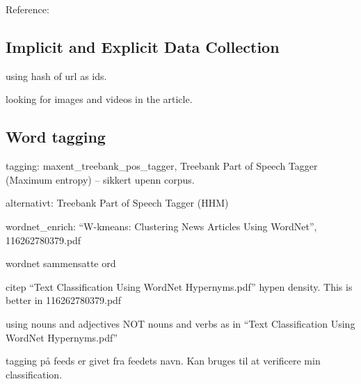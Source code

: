 

Reference: \cite{BleiTopics}



\subsection{Implicit and Explicit Data Collection}
\cite{MagdaliniWebMining}



using hash of url as ids.

looking for images and videos in the article.

\subsection{Word tagging}
tagging: maxent\_treebank\_pos\_tagger, Treebank Part of Speech Tagger (Maximum entropy) -- sikkert upenn corpus.

alternativt: Treebank Part of Speech Tagger (HHM)


wordnet\_enrich: ``W-kmeans: Clustering News Articles Using WordNet'', 116262780379.pdf

wordnet sammensatte ord

citep ``Text Classification Using WordNet Hypernyms.pdf''
hypen density. This is better in 116262780379.pdf

using nouns and adjectives NOT nouns and verbs as in ``Text Classification Using WordNet Hypernyms.pdf''


tagging på feeds er givet fra feedets navn. Kan bruges til at verificere min classification.



